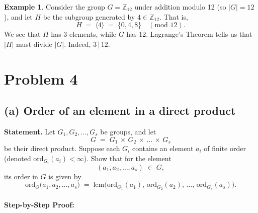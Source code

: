 \documentclass[12pt]{article}
\theoremstyle{definition} %
\newtheorem{example}{Example}
\theoremstyle{plain} %
\begin{document}
\begin{example}
Consider the group $G = \mathbb{Z}_{12}$ under addition modulo 12 (so $|G|=12$), and let $H$ be the subgroup generated by $4 \in \mathbb{Z}_{12}$. That is,
\[
  H \;=\; \langle 4 \rangle \;=\; \{0,4,8\} \quad (\text{mod }12).
\]
We see that $H$ has 3 elements, while $G$ has 12. Lagrange's Theorem tells us that $|H|$ must divide $|G|$. Indeed, $3 \,\big|\, 12$. 
\end{example}
\section*{Problem 4}

\subsection*{(a) Order of an element in a direct product}

\textbf{Statement.} Let $G_1, G_2, \dots, G_s$ be groups, and let 
\[
  G \;=\; G_1 \,\times\, G_2 \,\times\, \dots \,\times\, G_s
\]
be their direct product. Suppose each $G_i$ contains an element $a_i$ of finite order (denoted $\mathrm{ord}_{G_i}(a_i) < \infty$). Show that for the element
\[
  (a_1, a_2, \dots, a_s) \;\in\; G,
\]
its order in $G$ is given by 
\[
  \mathrm{ord}_G \bigl(a_1, a_2, \dots, a_s\bigr)
  \;=\; \mathrm{lcm}\!\bigl(\mathrm{ord}_{G_1}(a_1),\,\mathrm{ord}_{G_2}(a_2),\,\dots,\,\mathrm{ord}_{G_s}(a_s)\bigr).
\]

\paragraph{Step-by-Step Proof:}
\end{document}
